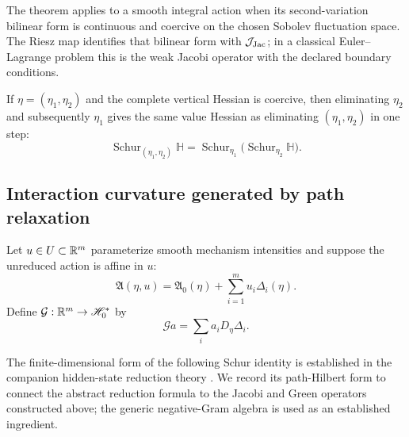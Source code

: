 The theorem applies to a smooth integral action when its second-variation
bilinear form is continuous and coercive on the chosen Sobolev fluctuation
space.  The Riesz map identifies that bilinear form with \(\mathcal J_{\mathrm{Jac}}\); in a
classical Euler--Lagrange problem this is the weak Jacobi operator with the
declared boundary conditions.

\begin{corollary}
\label{cor:path-schur-associativity}
If \(\eta=(\eta_1,\eta_2)\) and the complete vertical Hessian is coercive,
then eliminating \(\eta_2\) and subsequently \(\eta_1\) gives the same value
Hessian as eliminating \((\eta_1,\eta_2)\) in one step:
\begin{equation}
  \operatorname{Schur}_{(\eta_1,\eta_2)}\mathbb H
  =
  \operatorname{Schur}_{\eta_1}
  \bigl(\operatorname{Schur}_{\eta_2}\mathbb H\bigr).
  \tag{P7}
\end{equation}
\end{corollary}

\subsection{Interaction curvature generated by path relaxation}

Let \(u\in U\subset\mathbb R^m\) parameterize smooth mechanism intensities and
suppose the unreduced action is affine in \(u\):
\[
  \mathfrak A(\eta,u)
  =
  \mathfrak A_0(\eta)+\sum_{i=1}^m u_i\Delta_i(\eta).
\]
Define \(\mathcal G:\mathbb R^m\to\mathscr H_0^*\) by
\[
  \mathcal G a=\sum_i a_iD_\eta\Delta_i.
\]

The finite-dimensional form of the following Schur identity is established
in the companion hidden-state reduction theory
\cite{li2026optimizationgeometrodynamics}.  We record its path-Hilbert form to
connect the abstract reduction formula to the Jacobi and Green operators
constructed above; the generic negative-Gram algebra is used as an established
ingredient.

